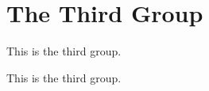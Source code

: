 \hypertarget{group__group3}{\section{The Third Group}
\label{group__group3}
}


This is the third group.  


This is the third group. 